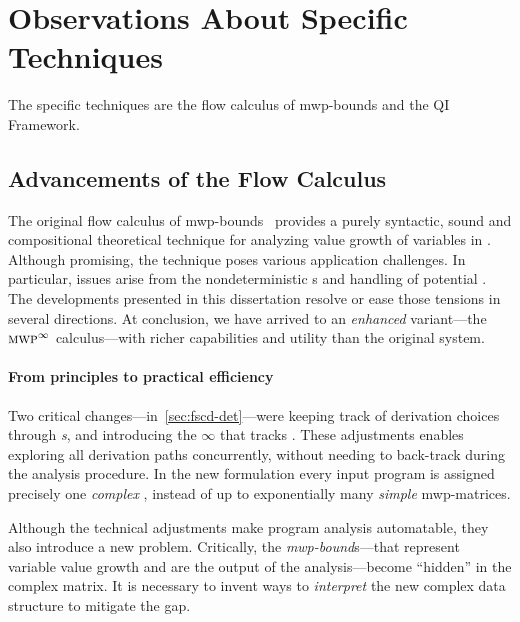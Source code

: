 \section{Observations About Specific Techniques}
\label{sec:res-specific}

The specific techniques are the flow calculus of mwp-bounds and the QI
Framework.

\subsection{Advancements of the Flow Calculus}
\label{subsec:res-flow-calc}

The original flow calculus of mwp-bounds~\cite{jones2009}
provides a purely syntactic, sound and
compositional theoretical technique for analyzing value
growth of variables in . Although promising, the
technique poses various application challenges. In particular, issues arise from
the nondeterministic s and handling of
potential . The developments presented in this
dissertation resolve or ease those tensions in several directions. At
conclusion, we have arrived to an \emph{enhanced} variant---\ie the
\(\textnormal{\textsc{mwp}}^\infty\) calculus---with richer capabilities and utility than the
original system.

\paragraph*{From principles to practical efficiency}
Two critical changes---in~\autoref{sec:fscd-det}---were keeping track of
derivation choices through \emph{s}, and introducing
the  \(\infty\) that tracks . These adjustments enables exploring all derivation paths
{concurrently}, without needing to back-track during the analysis procedure. In
the new formulation every input program is assigned precisely one \emph{complex}
, instead of up to exponentially many \emph{simple} mwp-matrices.

Although the technical adjustments make program analysis automatable, they also
introduce a new problem. Critically, the \emph{mwp-bound}s---that represent
variable value growth and are the output of the analysis---become
\enquote{hidden} in the complex matrix. It is necessary to invent ways to
\emph{interpret} the new complex data structure to mitigate the gap.

